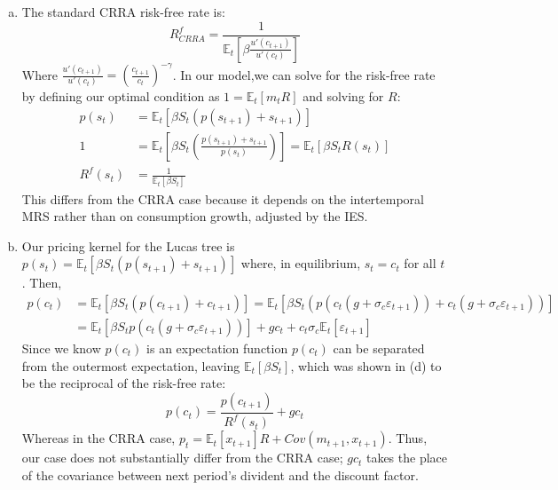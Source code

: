 \documentclass{article}
\newcommand{\Et}[1]{\mathbb{E}_t\left[#1\right]}
\begin{document}
\begin{enumerate}[(a)]
	\item The standard CRRA risk-free rate is:
		\[
			R^f_{CRRA} = \frac{1}{\Et{\beta\frac{u'(c_{t+1})}{u'(c_t)}}}
		\]
		Where ${\frac{u'(c_{t+1})}{u'(c_t)}=\left(\frac{c_{t+1}}{c_{t}}\right)^{-\gamma}}$. In our model,we can solve for the risk-free rate by defining our optimal condition as ${1 = \Et{m_tR}}$ and solving for $R$:
		\begin{align*}
			p(s_t) &= \Et{\beta S_t(p(s_{t+1})+s_{t+1})}	\\
			1 &= \Et{\beta S_t\left(\frac{p(s_{t+1})+s_{t+1}}{p(s_t)}\right)} = \Et{\beta S_tR(s_t)}	\\
			R^f(s_t) &= \frac{1}{\Et{\beta S_t}}
		\end{align*}
		This differs from the CRRA case because it depends on the intertemporal MRS rather than on consumption growth, adjusted by the IES.
	
	\item Our pricing kernel for the Lucas tree is ${p(s_t) = \Et{\beta S_t(p(s_{t+1})+s_{t+1})}}$ where, in equilibrium, ${s_t = c_t}$ for all $t$. Then, 
		\begin{align*}
			p(c_t) 	&= \Et{\beta S_t(p(c_{t+1})+c_{t+1})} = \Et{\beta S_t(p(c_t(g + \sigma_c\varepsilon_{t+1}))+c_t(g + \sigma_c\varepsilon_{t+1}))}	\\
					&= \Et{\beta S_tp(c_t(g + \sigma_c\varepsilon_{t+1}))}+ gc_t + c_t\sigma_c\Et{\varepsilon_{t+1}}
		\end{align*}
		Since we know $p(c_t)$ is an expectation function $p(c_t)$ can be separated from the outermost expectation, leaving $\Et{\beta S_t}$, which was shown in (d) to be the reciprocal of the risk-free rate:
		\[
			p(c_t) 	= \frac{p(c_{t+1})}{R^f(s_t)} + gc_t
		\]
		Whereas in the CRRA case, ${p_t = \Et{x_{t+1}}{R} + Cov(m_{t+1},x_{t+1})}$. Thus, our case does not substantially differ from the CRRA case; $gc_t$ takes the place of the covariance between next period's divident and the discount factor.
	
	
\end{enumerate}

\end{document}

